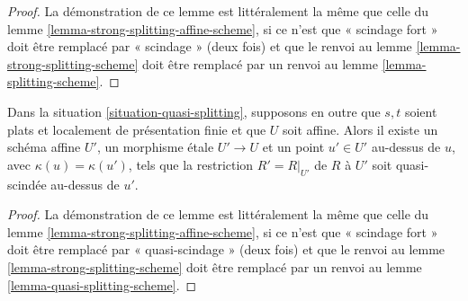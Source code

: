 \begin{proof}
La démonstration de ce lemme est littéralement la même que celle du
lemme \ref{lemma-strong-splitting-affine-scheme},
si ce n'est que « scindage fort » doit être remplacé par « scindage »
(deux fois) et que le renvoi au
lemme \ref{lemma-strong-splitting-scheme}
doit être remplacé par un renvoi au
lemme \ref{lemma-splitting-scheme}.
\end{proof}

\begin{lemma}
\label{lemma-quasi-splitting-affine-scheme}
Dans la situation \ref{situation-quasi-splitting}, supposons en outre que
$s, t$ soient plats et localement de présentation finie et que $U$ soit affine.
Alors il existe un schéma affine $U'$, un morphisme \'etale
$U' \to U$ et un point $u' \in U'$ au-dessus de $u$, avec
$\kappa(u) = \kappa(u')$, tels que la restriction $R' = R|_{U'}$ de
$R$ à $U'$ soit quasi-scindée au-dessus de $u'$.
\end{lemma}

\begin{proof}
La démonstration de ce lemme est littéralement la même que celle du
lemme \ref{lemma-strong-splitting-affine-scheme},
si ce n'est que « scindage fort » doit être remplacé par « quasi-scindage »
(deux fois) et que le renvoi au
lemme \ref{lemma-strong-splitting-scheme}
doit être remplacé par un renvoi au
lemme \ref{lemma-quasi-splitting-scheme}.
\end{proof}








